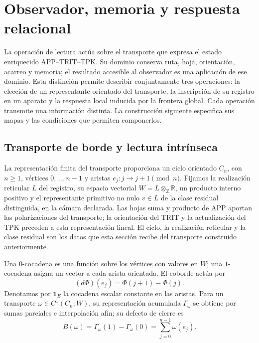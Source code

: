 
\section{Observador, memoria y respuesta relacional}
\label{vii:sec:observador-respuesta}

La operación de lectura actúa sobre el transporte que expresa el estado
enriquecido APP--TRIT--TPK. Su dominio conserva ruta, hoja, orientación,
acarreo y memoria; el resultado accesible al observador es una aplicación
de ese dominio. Esta distinción permite describir conjuntamente tres
operaciones: la elección de un representante orientado del transporte,
la inscripción de su registro en un aparato y la respuesta local inducida
por la frontera global. Cada operación transmite una información distinta.
La construcción siguiente especifica sus mapas y las condiciones que
permiten componerlos.

\subsection{Transporte de borde y lectura intrínseca}
\label{vii:sec:observador-ciclo}

La representación finita del transporte proporciona un ciclo orientado
\(C_n\), con \(n\geq1\), vértices \(0,\ldots,n-1\) y aristas
\(e_j:j\longrightarrow j+1\pmod n\). Fijamos la realización reticular
\(L\) del registro, su espacio vectorial
\(W=L\otimes_{\mathbb Z}\mathbb R\), un producto interno positivo y
el representante primitivo no nulo \(v\in L\) de la clase residual
distinguida, en la cámara declarada. Las hojas suma y producto de APP
aportan las polarizaciones del transporte; la orientación del TRIT y la
actualización del TPK preceden a esta representación lineal. El ciclo,
la realización reticular y la clase residual son los datos que esta
sección recibe del transporte construido anteriormente.

Una \(0\)-cocadena es una función sobre los vértices con valores en
\(W\); una \(1\)-cocadena asigna un vector a cada arista orientada.
El coborde actúa por
\[
 (d\Phi)(e_j)=\Phi(j+1)-\Phi(j).
\]
Denotamos por \(\mathbf1_E\) la cocadena escalar constante en las
aristas. Para un transporte \(\omega\in C^1(C_n;W)\), su representación
acumulada \(\Gamma_\omega\) se obtiene por sumas parciales e
interpolación afín; su defecto de cierre es
\begin{equation}
 B(\omega)=\Gamma_\omega(1)-\Gamma_\omega(0)
 =\sum_{j=0}^{n-1}\omega(e_j).
 \label{vii:eq:observador-defecto}
\end{equation}


